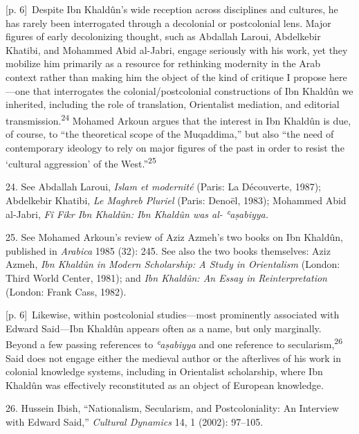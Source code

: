 \documentclass[10pt,a4paper]{article}
\begin{document}
{\scriptsize\color{gray} [p. 6]}\ Despite Ibn Khaldûn’s wide reception across disciplines and cultures, he has rarely been interrogated through a decolonial or postcolonial lens. Major figures of early decolonizing thought, such as Abdallah Laroui, Abdelkebir Khatibi, and Mohammed Abid al-Jabri, engage seriously with his work, yet they mobilize him primarily as a resource for rethinking modernity in the Arab context rather than making him the object of the kind of critique I propose here—one that interrogates the colonial/postcolonial constructions of Ibn Khaldûn we inherited, including the role of translation, Orientalist mediation, and editorial transmission.\nobreak\textsuperscript{24} Mohamed Arkoun argues that the interest in Ibn Khaldûn is due, of course, to “the theoretical scope of the Muqaddima,” but also “the need of contemporary ideology to rely on major figures of the past in order to resist the ‘cultural aggression’ of the West.”\nobreak\textsuperscript{25}\par{\small 24. See Abdallah Laroui, \textit{Islam et modernité} (Paris: La Découverte, 1987); Abdelkebir Khatibi, \textit{Le Maghreb Pluriel} (Paris: Denoël, 1983); Mohammed Abid al-Jabri, \textit{Fî Fikr Ibn Khaldûn: Ibn Khaldûn was al- ʿaṣabiyya.}\par}{\small 25. See Mohamed Arkoun’s review of Aziz Azmeh’s two books on Ibn Khaldûn, published in \textit{Arabica} 1985 (32): 245. See also the two books themselves: Aziz Azmeh, \textit{Ibn Khaldûn in Modern Scholarship: A Study in Orientalism} (London: Third World Center, 1981); and \textit{Ibn Khaldûn: An Essay in Reinterpretation} (London: Frank Cass, 1982).\par}
{\scriptsize\color{gray} [p. 6]}\ Likewise, within postcolonial studies—most prominently associated with Edward Said—Ibn Khaldûn appears often as a name, but only marginally. Beyond a few passing references to \textit{ʿaṣabiyya} and one reference to secularism,\nobreak\textsuperscript{26} Said does not engage either the medieval author or the afterlives of his work in colonial knowledge systems, including in Orientalist scholarship, where Ibn Khaldûn was effectively reconstituted as an object of European knowledge.\par{\small 26. Hussein Ibish, “Nationalism, Secularism, and Postcoloniality: An Interview with Edward Said,” \textit{Cultural Dynamics} 14, 1 (2002): 97–105.\par}
\end{document}
